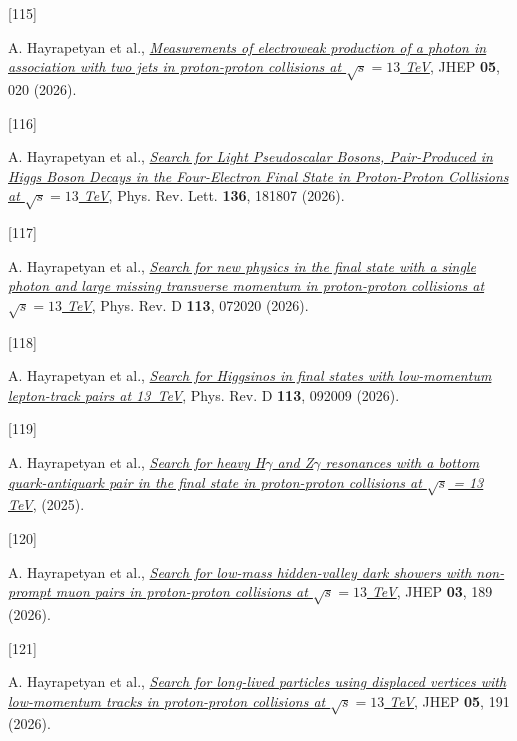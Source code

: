 \documentclass[
]{article}
\newlength{\cslhangindent}
\newlength{\csllabelwidth}
\newenvironment{CSLReferences}[2] %
 {\begin{list}{}{%
  \setlength{\itemindent}{0pt}
  \setlength{\leftmargin}{0pt}
  \setlength{\parsep}{0pt}
  \ifodd #1
   \setlength{\leftmargin}{\cslhangindent}
   \setlength{\itemindent}{-1\cslhangindent}
  \fi
  \setlength{\itemsep}{#2\baselineskip}}}
 {\end{list}}
\newcommand{\CSLLeftMargin}[1]{\parbox[t]{\csllabelwidth}{\strut#1\strut}}
\newcommand{\CSLRightInline}[1]{\parbox[t]{\linewidth - \csllabelwidth}{\strut#1\strut}}
\begin{document}
\begin{CSLReferences}{0}{0}
\CSLLeftMargin{{[}115{]} }%
\CSLRightInline{A. Hayrapetyan et al.,
\emph{\href{https://doi.org/10.1007/JHEP05(2026)020}{{Measurements of
electroweak production of a photon in association with two jets in
proton-proton collisions at \(\sqrt{s}=13\) TeV}}}, JHEP \textbf{05},
020 (2026).}

\CSLLeftMargin{{[}116{]} }%
\CSLRightInline{A. Hayrapetyan et al.,
\emph{\href{https://doi.org/10.1103/r53x-8fqp}{{Search for Light
Pseudoscalar Bosons, Pair-Produced in Higgs Boson Decays in the
Four-Electron Final State in Proton-Proton Collisions at \(\sqrt{s}=13\)
TeV}}}, Phys. Rev. Lett. \textbf{136}, 181807 (2026).}

\CSLLeftMargin{{[}117{]} }%
\CSLRightInline{A. Hayrapetyan et al.,
\emph{\href{https://doi.org/10.1103/f9r8-styj}{{Search for new physics
in the final state with a single photon and large missing transverse
momentum in proton-proton collisions at \(\sqrt{s}=13\) TeV}}}, Phys.
Rev. D \textbf{113}, 072020 (2026).}

\CSLLeftMargin{{[}118{]} }%
\CSLRightInline{A. Hayrapetyan et al.,
\emph{\href{https://doi.org/10.1103/w3b5-92ls}{{Search for Higgsinos in
final states with low-momentum lepton-track pairs at 13~TeV}}}, Phys.
Rev. D \textbf{113}, 092009 (2026).}

\CSLLeftMargin{{[}119{]} }%
\CSLRightInline{A. Hayrapetyan et al.,
\emph{\href{https://arxiv.org/abs/2511.14583}{{Search for heavy H\(\ensuremath{\gamma}\)
and Z\(\ensuremath{\gamma}\) resonances with a bottom quark-antiquark pair in the final
state in proton-proton collisions at \(\sqrt{s}\) = 13 TeV}}}, (2025).}

\CSLLeftMargin{{[}120{]} }%
\CSLRightInline{A. Hayrapetyan et al.,
\emph{\href{https://doi.org/10.1007/JHEP03(2026)189}{{Search for
low-mass hidden-valley dark showers with non-prompt muon pairs in
proton-proton collisions at \(\sqrt{s}=13\) TeV}}}, JHEP \textbf{03},
189 (2026).}

\CSLLeftMargin{{[}121{]} }%
\CSLRightInline{A. Hayrapetyan et al.,
\emph{\href{https://doi.org/10.1007/JHEP05(2026)191}{{Search for
long-lived particles using displaced vertices with low-momentum tracks
in proton-proton collisions at \(\sqrt{s}=13\) TeV}}}, JHEP \textbf{05},
191 (2026).}


\end{CSLReferences}
\end{document}
